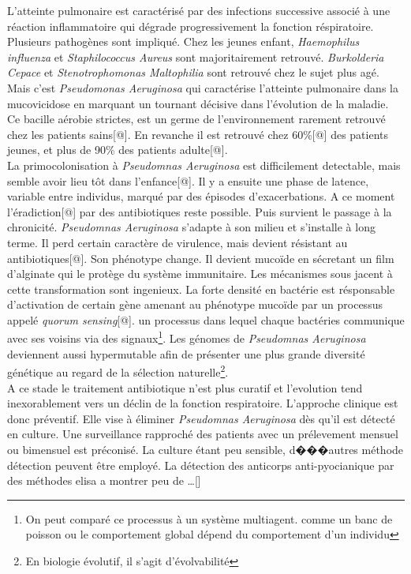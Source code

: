 \documentclass[12pt,a4paper]{article}
\begin{document}
L’atteinte pulmonaire est caractérisé par des infections successive associé à une réaction inflammatoire qui dégrade progressivement la fonction réspiratoire.
Plusieurs pathogènes sont impliqué. Chez les jeunes enfant, \textit{Haemophilus influenza} et \textit{Staphilococcus Aureus} sont majoritairement retrouvé. \textit{Burkolderia Cepace} et \textit{Stenotrophomonas Maltophilia} sont retrouvé chez le sujet plus agé.
Mais c’est \textit{Pseudomonas Aeruginosa} qui caractérise l’atteinte pulmonaire dans la mucovicidose en marquant un tournant décisive dans l’évolution de la maladie. Ce bacille aérobie strictes, est un germe de l'environnement rarement retrouvé chez les patients sains[@]. En revanche il est retrouvé chez 60\%[@] des patients jeunes, et plus de 90\% des patients adulte[@].\\
La primocolonisation à \textit{Pseudomnas Aeruginosa} est difficilement detectable, mais semble avoir lieu tôt dans l’enfance[@]. Il y a ensuite une phase de latence, variable entre individus, marqué par des épisodes d’exacerbations. A ce moment l’éradiction[@] par des antibiotiques reste possible.
Puis survient le passage à la chronicité. \textit{Pseudomnas Aeruginosa} s'adapte à son milieu et s’installe à long terme. Il perd certain caractère de virulence, mais devient résistant au antibiotiques[@]. Son phénotype change. Il devient mucoïde en sécretant un film d’alginate qui le protège du système immunitaire. Les mécanismes sous jacent à cette transformation sont ingenieux. La forte densité en bactérie est résponsable d’activation de certain gène amenant au phénotype mucoïde par un processus appelé \textit{quorum sensing}[@]. un processus dans lequel chaque bactéries communique avec ses voisins via des signaux\footnote{On peut comparé ce processus à un système multiagent. comme un banc de poisson ou le comportement global dépend du comportement d’un individu}.
Les génomes de \textit{Pseudomnas Aeruginosa} deviennent aussi hypermutable afin de présenter une plus grande diversité génétique au regard de la sélection naturelle\footnote{En biologie évolutif, il s'agit d'évolvabilité}. \\
A ce stade le traitement antibiotique n’est plus curatif et l'evolution tend inexorablement vers un déclin de la fonction respiratoire.
L'approche clinique est donc préventif. Elle  vise à éliminer \textit{Pseudomnas Aeruginosa} dès qu’il est détecté en culture. Une surveillance rapproché des patients avec un prélevement mensuel ou bimensuel est préconisé. La culture étant peu sensible, d���autres méthode détection peuvent être employé. La détection des anticorps anti-pyocianique par des méthodes elisa a montrer peu de …[]
\end{document}
